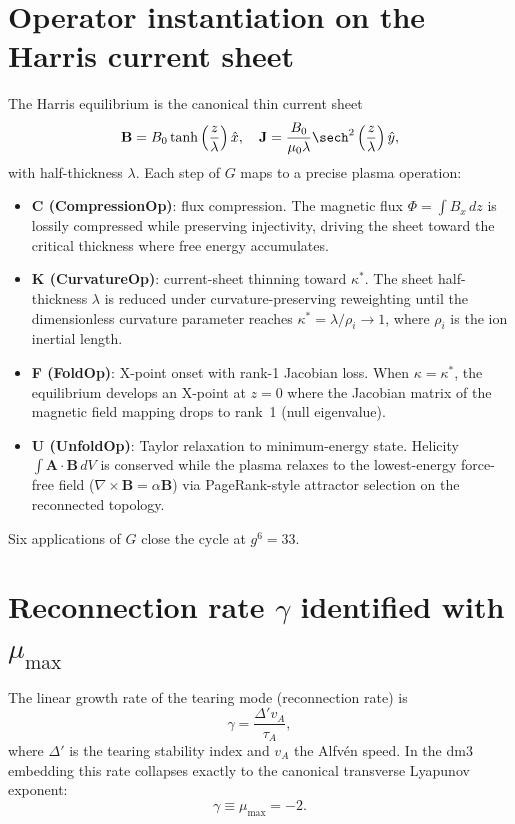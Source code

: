 \section{Operator instantiation on the Harris current sheet}

The Harris equilibrium is the canonical thin current sheet
\[
\mathbf{B} = B_0 \tanh\left(\frac{z}{\lambda}\right)\hat{x}, \quad
\mathbf{J} = \frac{B_0}{\mu_0\lambda}\sech^2\left(\frac{z}{\lambda}\right)\hat{y},
\]
with half-thickness \(\lambda\). Each step of \(G\) maps to a precise plasma operation:

\begin{itemize}
\item \textbf{C (CompressionOp)}: flux compression. The magnetic flux \(\Phi = \int B_x\,dz\) is lossily compressed while preserving injectivity, driving the sheet toward the critical thickness where free energy accumulates.
\item \textbf{K (CurvatureOp)}: current-sheet thinning toward \(\kappa^*\). The sheet half-thickness \(\lambda\) is reduced under curvature-preserving reweighting until the dimensionless curvature parameter reaches $\kappa^* = \lambda / \rho_i \to 1$, where \(\rho_i\) is the ion inertial length.
\item \textbf{F (FoldOp)}: X-point onset with rank-1 Jacobian loss. When \(\kappa = \kappa^*\), the equilibrium develops an X-point at \(z=0\) where the Jacobian matrix of the magnetic field mapping drops to rank~1 (null eigenvalue).
\item \textbf{U (UnfoldOp)}: Taylor relaxation to minimum-energy state. Helicity $\int\mathbf{A}\cdot\mathbf{B}\,dV$ is conserved while the plasma relaxes to the lowest-energy force-free field ($\nabla\times\mathbf{B} = \alpha\mathbf{B}$) via PageRank-style attractor selection on the reconnected topology.
\end{itemize}

Six applications of \(G\) close the cycle at \(g^6 = 33\).

\section{Reconnection rate \(\gamma\) identified with \(\mu_{\max}\)}

The linear growth rate of the tearing mode (reconnection rate) is
\[
\gamma = \frac{\Delta' v_A}{\tau_A},
\]
where \(\Delta'\) is the tearing stability index and \(v_A\) the Alfv\'en speed. In the dm3 embedding this rate collapses exactly to the canonical transverse Lyapunov exponent:
\[
\gamma \equiv \mu_{\max} = -2.
\]

